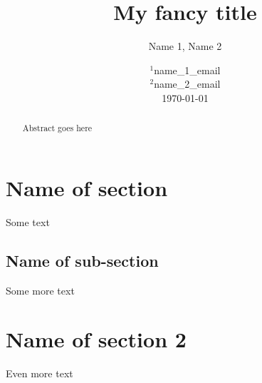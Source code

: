 \documentclass{article}
\title{My fancy title}
\author{Name 1, Name 2}
\date{%
	$^1$name\_1\_email \\%
	$^2$name\_2\_email\\[2ex]%
	\today
}
\begin{document}
\maketitle
\tableofcontents
\bigskip

\begin{abstract}
Abstract goes here
\end{abstract}

\section{Name of section}
Some text
\subsection{Name of sub-section}
Some more text
\section{Name of section 2}
Even more text
\end{document}

